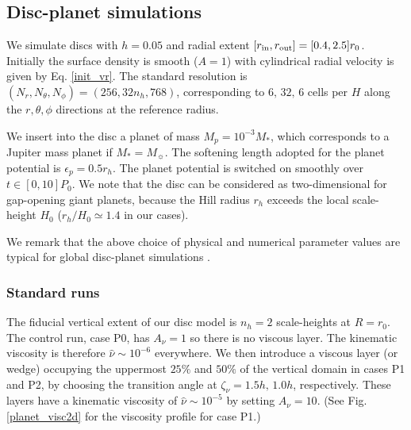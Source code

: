 
\subsection{Disc-planet simulations} 
We simulate discs with $h=0.05$ and radial extent
$[r_\mathrm{in},r_\mathrm{out}]=[0.4,2.5]r_0$. Initially the surface density is smooth
($A=1$) with cylindrical radial velocity is given by
Eq. \ref{init_vr}. The standard resolution is $(N_r, N_\theta,
N_\phi)=(256, 32n_h, 768)$, corresponding to $6,\,32,\,6$ 
cells per $H$ along the $r,\theta,\phi$ directions at the reference
radius.  

We insert into the disc a planet of mass  
$M_p=10^{-3}M_*$, which corresponds to a Jupiter mass planet if
$M_*=M_{\sun}$. The softening length adopted for the planet potential is
$\epsilon_p=0.5r_h$. The planet potential is switched on 
smoothly over $t\in[0,10]P_0$. We note that the disc can be considered
as two-dimensional for gap-opening giant planets, because the Hill
radius $r_h$ exceeds the local scale-height $H_0$ ($r_h/H_0\simeq1.4$
in our cases).   

We remark that the above choice of physical and numerical parameter
values are typical for global disc-planet simulations
\citep[e.g.][]{valborro06,mignone12}.   

\subsubsection{Standard runs} 
The fiducial vertical extent of our disc model is $n_h=2$
scale-heights at $R=r_0$.  The control run, case P0, has $A_\nu=1$ so there is 
no viscous layer. The kinematic viscosity is therefore
$\hat{\nu}\sim10^{-6}$  everywhere. We then introduce a viscous
layer (or wedge) occupying the uppermost $25\%$ and $50\%$ of the
vertical domain in cases P1 and P2, by choosing the transition angle
at $\zeta_\nu = 1.5h,\,1.0h$, respectively. These layers have a kinematic 
viscosity of $\hat{\nu}\sim 10^{-5}$ by setting $A_\nu=10$.  (See
Fig. \ref{planet_visc2d} for the viscosity profile for case P1.)  


